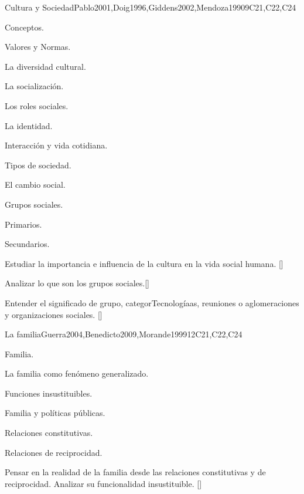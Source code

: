 \begin{syllabus}
\begin{unit}{}{Cultura y Sociedad}{Pablo2001,Doig1996,Giddens2002,Mendoza1990}{9}{C21,C22,C24}
\begin{topics}
    \item Conceptos.
    \item Valores y Normas.
    \item La diversidad cultural.
    \item La socialización.
    \item Los roles sociales.
    \item La identidad.
    \item Interacción y vida cotidiana.
    \item Tipos de sociedad.
    \item El cambio social.
    \item Grupos sociales.
    \begin{subtopics}
	    \item Primarios.
	    \item Secundarios.
    \end{subtopics}
\end{topics}

\begin{learningoutcomes}
    \item Estudiar la importancia e influencia de la cultura en la vida social humana. [\Familiarity]
    \item Analizar lo que son los grupos sociales.[\Familiarity]
    \item Entender el significado de grupo, categorTecnologíaas, reuniones o aglomeraciones y organizaciones sociales. [\Familiarity]
\end{learningoutcomes}
\end{unit}

\begin{unit}{}{La familia}{Guerra2004,Benedicto2009,Morande1999}{12}{C21,C22,C24}
\begin{topics}
    \item Familia.
    \item La familia como fenómeno generalizado.
    \item Funciones insustituibles.
    \item Familia y polí­ticas públicas.
    \item Relaciones constitutivas.
    \item Relaciones de reciprocidad.
\end{topics}
\begin{learningoutcomes}
	\item Pensar en la realidad de la familia desde las relaciones constitutivas y de reciprocidad. Analizar su funcionalidad insustituible. [\Familiarity]
\end{learningoutcomes}
\end{unit}


\end{syllabus}
